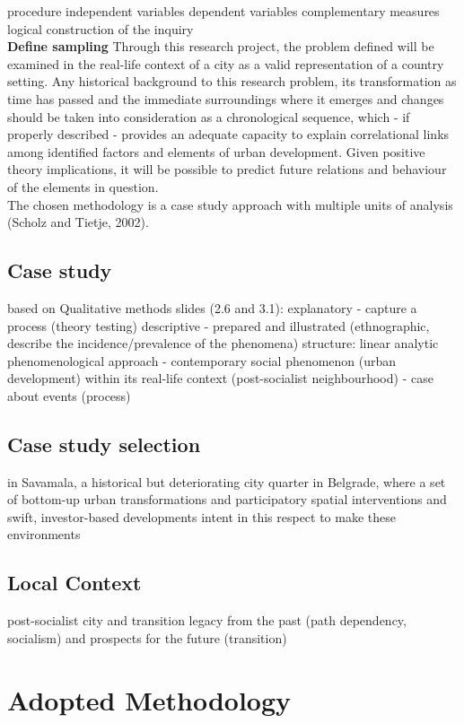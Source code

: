 \documentclass[11pt]{report}
\begin{document}
procedure
independent variables
dependent variables
complementary measures
logical construction of the inquiry
\\
\textbf{Define sampling}
Through this research project, the problem defined will be examined in the real-life context of a city as a valid representation of a country setting. Any historical background to this research problem, its transformation as time has passed and the immediate surroundings where it emerges and changes should be taken into consideration as a chronological sequence, which - if properly described - provides an adequate capacity to explain correlational links among identified factors and elements of urban development. Given positive theory implications, it will be possible to predict future relations and behaviour of the elements in question.
\\
The chosen methodology is a case study approach with multiple units of analysis (Scholz and Tietje, 2002). 

\subsection{Case study}

based on Qualitative methods slides (2.6 and 3.1):
explanatory - capture a process (theory testing)
descriptive - prepared and illustrated (ethnographic, describe the incidence/prevalence of the phenomena)
structure: linear analytic
phenomenological approach - contemporary social phenomenon (urban development) within its real-life context (post-socialist neighbourhood) - case about events (process)


\subsection{Case study selection}
in Savamala, a historical but deteriorating city quarter in Belgrade, where a set of bottom-up urban transformations and participatory spatial interventions and swift, investor-based developments intent in this respect to make these environments 
\subsection{Local Context}

post-socialist city and transition
legacy from the past (path dependency, socialism) and prospects for the future (transition)

\section{Adopted Methodology}
\end{document}
